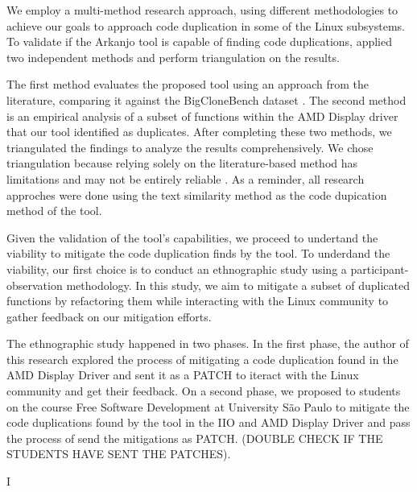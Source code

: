 We employ a multi-method research approach, using different methodologies to achieve our goals
to approach code duplication in some of the Linux subsystems. 
To validate if the Arkanjo tool is capable of finding code duplications, 
applied two independent methods and perform triangulation on the results. 

The first method evaluates the proposed tool using an approach from the literature, 
comparing it against the BigCloneBench dataset \citep{bigclonebench}. 
The second method is an empirical analysis of a subset of functions within the 
AMD Display driver that our tool identified as duplicates. After completing these two 
methods, we triangulated the findings to analyze the results comprehensively. 
We chose triangulation because relying solely on the literature-based method has 
limitations and may not be entirely reliable \citep{bigfail, litreview}. As a reminder, 
all research approches were done using the text similarity method as the 
code dupication method of the tool.

Given the validation of the tool's capabilities, we proceed to undertand the viability 
to mitigate the code duplication finds by the tool. 
To underdand the viability, our first choice is to conduct an ethnographic study using 
a participant-observation methodology. 
In this study, we aim to mitigate a subset of duplicated functions by refactoring them 
while interacting with the Linux community to gather feedback on our mitigation efforts. 

The ethnographic study happened in two phases. 
In the first phase, the author of this research explored the process of mitigating
a code duplication found in the AMD Display Driver and sent it as a PATCH to iteract with the
Linux community and get their feedback. On a second phase, we proposed to students on the 
course Free Software Development at University São Paulo to mitigate the code duplications found 
by the tool in the IIO and AMD Display Driver and pass the process of send the mitigations as PATCH.
(DOUBLE CHECK IF THE STUDENTS HAVE SENT THE PATCHES). 

I 



